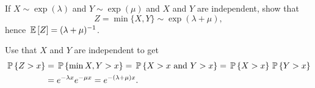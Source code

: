 \begin{question}\label{ex:10}
  If $X\sim\exp(\lambda)$ and $Y\sim\exp(\mu)$ and $X$ and $Y$ are
  independent, show that 
  \begin{equation*}
Z=\min\{X,Y\}\sim\exp(\lambda+\mu),
  \end{equation*}
hence $\E Z = (\lambda+\mu)^{-1}$.


  \begin{solution}
Use that $X$ and $Y$ are independent to get
    \begin{equation*}
      \begin{split}
      \P{Z>x} 
&= \P{\min{X,Y}>x} = \P{X>x\text{ and } Y>x} = \P{X>x}\P{Y>x} \\
&= e^{-\lambda x} e^{-\mu x} = e^{-(\lambda+\mu)x}.
      \end{split}
    \end{equation*}
  \end{solution}

\end{question}

